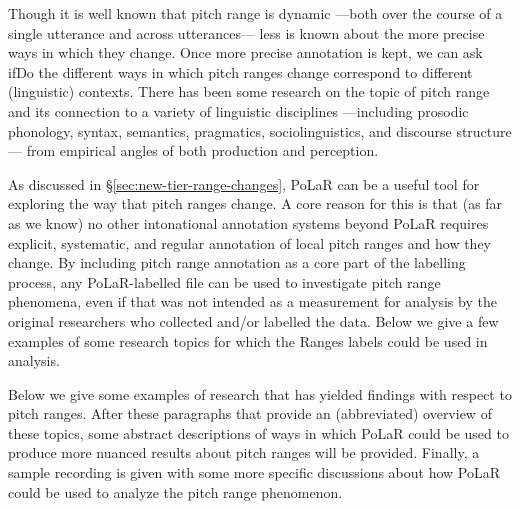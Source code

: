 Though it is well known that pitch range is dynamic —both over the course of a single utterance and across utterances— less is known about the more precise ways in which they change. Once more precise annotation is kept, we can ask ifDo the different ways in which pitch ranges change correspond to different (linguistic) contexts. There has been some research on the topic of pitch range and its connection to a variety of linguistic disciplines —including prosodic phonology, syntax, semantics, pragmatics, sociolinguistics, and discourse structure— from empirical angles of both production and perception.

As discussed in §\ref{sec:new-tier-range-changes}, PoLaR can be a useful tool for exploring the way that pitch ranges change. A core reason for this is that (as far as we know) no other intonational annotation systems beyond PoLaR requires explicit, systematic, and regular annotation of local pitch ranges and how they change. By including pitch range annotation as a core part of the labelling process, any PoLaR-labelled file can be used to investigate pitch range phenomena, even if that was not intended as a measurement for analysis by the original researchers who collected and/or labelled the data. Below we give a few examples of some research topics for which the Ranges labels could be used in analysis.

Below we give some examples of research that has yielded findings with respect to pitch ranges. After these paragraphs that provide an (abbreviated) overview of these topics, some abstract descriptions of ways in which PoLaR could be used to produce more nuanced results about pitch ranges will be provided. Finally, a sample recording is given with some more specific discussions about how PoLaR could be used to analyze the pitch range phenomenon.

